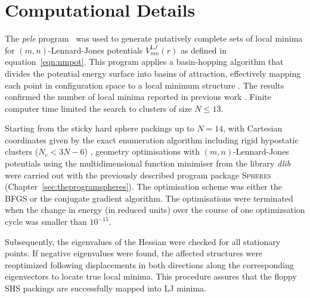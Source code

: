 

\section{Computational Details}

The \textit{pele} program~\autocite{_pelePythonenergy_2017} was used to generate putatively
complete sets of local minima for $(m,n)$-Lennard-Jones potentials 
$V_{mn}^{\mathrm LJ}(r)$ as defined in equation~\eqref{eqn:nmpot}.
This program  applies a basin-hopping algorithm that divides the potential energy
surface into basins of attraction, effectively mapping each point in
configuration space to a local minimum structure
\autocite{Li_MonteCarlominimizationapproach_1987,waless99,Wales_GlobalOptimizationBasinHopping_1997}.  The results confirmed the
number of local minima reported in previous work \autocite{Doye_Saddlepointsdynamics_2002}.
Finite computer time limited the search to clusters of size $N \leq 13$.

Starting from the sticky hard sphere packings up to $N=14$, with Cartesian
coordinates given by the exact enumeration algorithm
\autocite{Hoy_Structurefinitesphere_2012} including rigid hypostatic clusters
($N_c<3N-6$) \autocite{Holmes-Cerfon_EnumeratingRigidSphere_2016}, geometry
optimisations with $(m,n)$-Lennard-Jones potentials using the multidimensional
function minimiser from the \Cpp library \textit{dlib}
\autocite{King_DlibmlMachineLearning_2009} were carried out with the previously
described program package \textsc{Spheres}
(Chapter~\ref{sec:theprogramspheres}). The optimisation scheme was either the
\ac{BFGS} or the conjugate gradient algorithm. The optimisations were terminated when the
change in energy (in reduced units) over the course of one optimizsation cycle
was smaller than $10^{-15}$. 

Subsequently, the eigenvalues of the Hessian were checked
for all stationary points. If negative eigenvalues were found, the affected
structures were reoptimized following displacements in both directions along
the corresponding eigenvectors to locate true local minima. This procedure assures
that the floppy \ac{SHS} packings are successfully mapped into \ac{LJ} minima.


